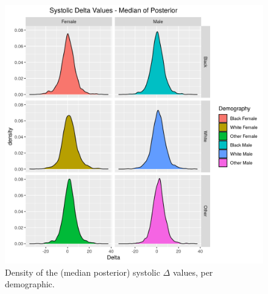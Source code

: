 \documentclass[
]{article}
\begin{document}
\begin{figure}
\centering
\includegraphics{./Rmarkdown_Plots/SysDelta_Densities_Demography.png}
\caption{Density of the (median posterior) systolic \(\Delta\) values, per demographic.}\label{fig:DeltaDens}
\end{figure}
\end{document}
